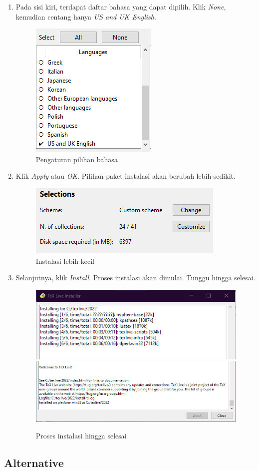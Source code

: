 \documentclass{book} %
\begin{document}
\begin{enumerate}
		\item Pada sisi kiri, terdapat daftar bahasa yang dapat dipilih.
		Klik \textit{None}, kemudian centang hanya \textit{US and UK English}.

		\begin{figure}[!ht]
			\centering
			\includegraphics[width=0.2\linewidth]{images/texlivewin6}
			\caption{Pengaturan pilihan bahasa}
		\end{figure}

		\item Klik \textit{Apply} atau \textit{OK}.
		Pilihan paket instalasi akan berubah lebih sedikit.

		\begin{figure}[!ht]
			\centering
			\includegraphics[width=0.3\linewidth]{images/texlivewin7}
			\caption{Instalasi lebih kecil}
		\end{figure}

		\item Selanjutnya, klik \textit{Install}.
		Proses instalasi akan dimulai.
		Tunggu hingga selesai.

		\begin{figure}[!ht]
			\centering
			\includegraphics[width=0.4\linewidth]{images/texlivewin8}
			\includegraphics[width=0.4\linewidth]{images/texlivewin9}
			\caption{Proses instalasi hingga selesai}
		\end{figure}

	\end{enumerate}

	\newpage
	\subsection{Alternative}
\end{document}
